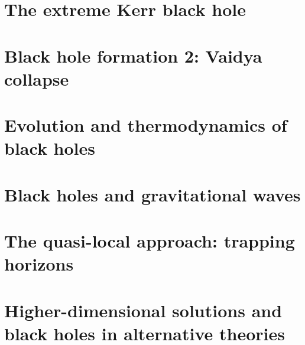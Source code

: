 \documentclass[12pt,a4paper]{book}
\begin{document}


\chapter{The extreme Kerr black hole} \label{s:ext}



\chapter{Black hole formation 2: Vaidya collapse} \label{s:vai}

\chapter{Evolution and thermodynamics of black holes}

\chapter{Black holes and gravitational waves}

\chapter{The quasi-local approach: trapping horizons} \label{s:loc}

\chapter{Higher-dimensional solutions and black holes in alternative theories} \label{s:hid}

\appendix








\cleardoublepage
{} %
\printindex
\end{document}
